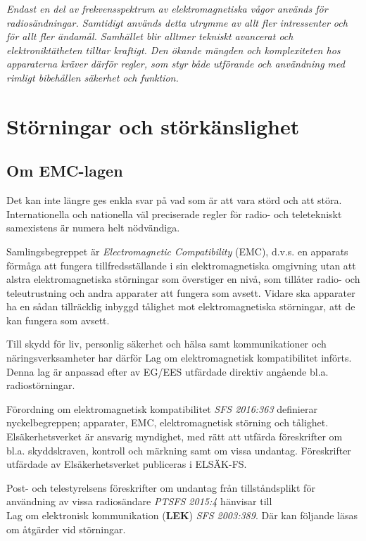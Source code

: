 \emph{Endast en del av frekvensspektrum av elektromagnetiska vågor används för
radiosändningar. Samtidigt används detta utrymme av allt fler intressenter och
för allt fler ändamål. Samhället blir alltmer tekniskt avancerat och
elektroniktätheten tilltar kraftigt. Den ökande mängden och komplexiteten hos
apparaterna kräver därför regler, som styr både utförande och användning med
rimligt bibehållen säkerhet och funktion.}

\section{Störningar och störkänslighet}

\subsection{Om EMC-lagen}
\label{EMC-lagen}

Det kan inte längre ges enkla svar på vad som är att vara störd och att störa.
Internationella och nationella väl preciserade regler för radio- och
teletekniskt samexistens är numera helt nödvändiga.

Samlingsbegreppet är \emph{Electromagnetic Compatibility} (EMC), d.v.s. en
apparats förmåga att fungera tillfredsställande i sin elektromagnetiska
omgivning utan att alstra elektromagnetiska störningar som överstiger en nivå,
som tillåter radio- och teleutrustning och andra apparater att fungera som
avsett. Vidare ska apparater ha en sådan tillräcklig inbyggd tålighet mot
elektromagnetiska störningar, att de kan fungera som avsett.

Till skydd för liv, personlig säkerhet och hälsa samt kommunikationer och
näringsverksamheter har därför Lag om elektromagnetisk kompatibilitet införts.
Denna lag är anpassad efter av EG/EES utfärdade direktiv angående bl.a.
radiostörningar.

Förordning om elektromagnetisk kompatibilitet \emph{SFS 2016:363} definierar
nyckelbegreppen; apparater, EMC, elektromagnetisk störning och tålighet.
Elsäkerhetsverket är ansvarig myndighet, med rätt att utfärda föreskrifter om
bl.a. skyddskraven, kontroll och märkning samt om vissa undantag.
Föreskrifter utfärdade av Elsäkerhetsverket publiceras i ELSÄK-FS.

Post- och telestyrelsens föreskrifter om undantag från tillståndsplikt för användning av vissa radiosändare \emph{PTSFS 2015:4} hänvisar till\\
Lag om elektronisk kommunikation (\textbf{LEK}) \emph{SFS 2003:389}. Där kan följande läsas om åtgärder vid störningar.

